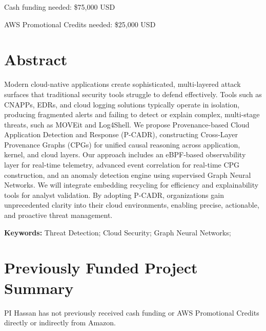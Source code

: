 \documentclass[11pt,pdftex]{article}
\begin{document}
\thispagestyle{firststyle}
\vspace{-3mm}

Cash funding needed: \$75,000 USD

AWS Promotional Credits needed: \$25,000 USD

  \section*{Abstract}
  Modern cloud-native applications create sophisticated, multi-layered attack surfaces that traditional security tools struggle to defend effectively. Tools such as CNAPPs, EDRs, and cloud logging solutions typically operate in isolation, producing fragmented alerts and failing to detect or explain complex, multi-stage threats, such as MOVEit and Log4Shell. We propose Provenance-based Cloud Application Detection and Response (P-CADR), constructing Cross-Layer Provenance Graphs (CPGs) for unified causal reasoning across application, kernel, and cloud layers. Our approach includes an eBPF-based observability layer for real-time telemetry, advanced event correlation for real-time CPG construction, and an anomaly detection engine using supervised Graph Neural Networks. We will integrate embedding recycling for efficiency and explainability tools for analyst validation. By adopting P-CADR, organizations gain unprecedented clarity into their cloud environments, enabling precise, actionable, and proactive threat management.



\smallskip
{\bf Keywords:} Threat Detection; Cloud Security; Graph Neural Networks;


\thispagestyle{firststyle}
\setcounter{page}{1}


\pagestyle{plain}
\newpage

\setcounter{page}{1}
{\scriptsize
\printbibliography
}

\newpage


\setcounter{page}{1}
\newpage
\section*{Previously Funded Project Summary}
PI Hassan has not previously received cash funding or AWS Promotional Credits directly or indirectly from Amazon.
\end{document}

